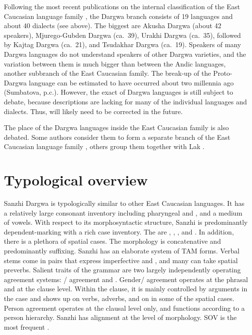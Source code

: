 Following the most recent publications on the internal classification of the East Caucasian language family \citep{Korjakov2006, Korjakov.Sumbatova2007}, the Dargwa branch consists of 19 languages and about 40 dialects (see  above). The biggest are Akusha Dargwa (about 42 speakers), Mjurego-Gubden Dargwa (ca.~39), Urakhi Dargwa (ca.~35), followed by Kajtag Dargwa (ca.~21), and Tsudakhar Dargwa (ca.~19). Speakers of many Dargwa languages do not understand speakers of other Dargwa varieties, and the variation between them is much bigger than between the Andic languages, another subbranch of the East Caucasian family. The break-up of the Proto-Dargwa language can be estimated to have occurred about two millennia ago (Sumbatova, p.c.). However, the exact  of Dargwa languages is still subject to debate, because descriptions are lacking for many of the individual languages and dialects. Thus,  will likely need to be corrected in the future.

The place of the Dargwa languages inside the East Caucasian family is also debated. Some authors consider them to form a separate branch of the East Caucasian language family \citep[142]{Gigineishvili1977, Kibrik1996}, others group them together with Lak \citep{Haspelmath1993, Korjakov2006, vandenBerg2005}.



\section{Typological overview}
\label{sec:Typological overview}

Sanzhi Dargwa is typologically similar to other East Caucasian languages. It has a relatively large consonant inventory including pharyngeal and  , and a medium  of vowels. With respect to its morphosyntactic structure, Sanzhi is predominantly dependent-marking with a rich case inventory. The  are , , , and . In addition, there is a plethora of spatial cases. The morphology is concatenative and predominantly suffixing. Sanzhi has an elaborate system of TAM forms. Verbal stems come in pairs that express imperfective and , and many can take spatial preverbs. Salient traits of the grammar are two largely independently operating agreement systems: / agreement and . Gender/ agreement operates at the phrasal and at the clause level. Within the clause, it is mainly controlled by arguments in the  case and shows up on verbs, adverbs, and on  in some of the spatial cases. Person agreement operates at the clausal level only, and functions according to a person hierarchy. Sanzhi has  alignment at the level of morphology. SOV is the most frequent .

